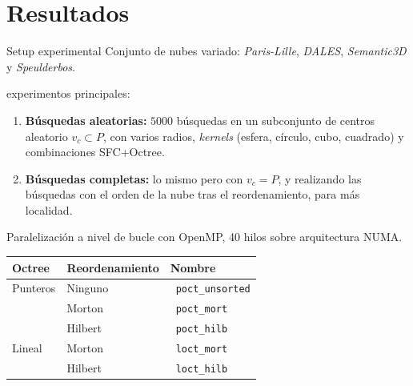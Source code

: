 \documentclass[aspectratio=169]{beamer}
\newcommand{\dotUnencoded}{\textcolor{octUnencoded}{\textbullet}~}
\newcommand{\dotOctMort}{\textcolor{octMort}{\textbullet}~}
\newcommand{\dotOctHilb}{\textcolor{octHilb}{\textbullet}~}
\newcommand{\dotLoctMort}{\textcolor{loctMort}{\textbullet}~}
\newcommand{\dotLoctHilb}{\textcolor{loctHilb}{\textbullet}~}
\begin{document}
\section{Resultados}
\begin{frame}{Setup experimental}
    Conjunto de nubes variado: \textit{Paris-Lille}, \textit{DALES}, \textit{Semantic3D} y \textit{Speulderbos}. %

    \textrightarrow {} experimentos principales:
    \begin{enumerate}
        \item \textbf{Búsquedas aleatorias:} $5000$ búsquedas en un subconjunto de centros aleatorio $v_c \subset P$, con varios radios, \textit{kernels} (esfera, círculo, cubo, cuadrado) y combinaciones SFC+Octree. 
        \item \textbf{Búsquedas completas:} lo mismo pero con $v_c = P$, y realizando las búsquedas con el orden de la nube tras el reordenamiento, para más localidad.
    \end{enumerate}
    \textrightarrow \: Paralelización a nivel de bucle con OpenMP, 40 hilos sobre arquitectura NUMA.

    \begin{table}
    
        \begin{tabular}{@{}lll@{}}
            \textbf{Octree} & \textbf{Reordenamiento} & \textbf{Nombre} \\
            \hline
            Punteros        & Ninguno       & \dotUnencoded \texttt{poct\_unsorted} \\
                            & Morton        & \dotOctMort \texttt{poct\_mort} \\
                            & Hilbert       & \dotOctHilb \texttt{poct\_hilb} \\
            \hline
            Lineal          & Morton        & \dotLoctMort \texttt{loct\_mort} \\
                            & Hilbert       & \dotLoctHilb \texttt{loct\_hilb} \\
        \end{tabular}
    \end{table}
\end{frame}
\end{document}
